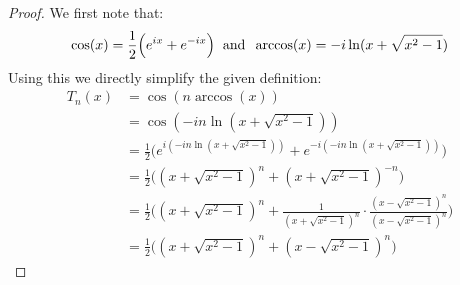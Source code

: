 \documentclass[12pt, letterpaper, onecolumn, conference, final]{IEEEtran}
\theoremstyle{definition}
\newtheorem{proposition}{Proposition}
\theoremstyle{plain}
\begin{document}
\begin{center}
\end{center}

\begin{proof}
We first note that:
\begin{equation*}
\cos(x) = \frac{1}{2}\Big( e^{ix} + e^{-ix} \Big) \hspace{.2cm} \text{and} \hspace{.2cm} \arccos(x) = -i\ln(x + \sqrt{x^2 - 1})
\end{equation*}
Using this we directly simplify the given definition:
\begin{equation*}
\begin{split}
T_n(x) &= \cos(n\arccos(x)) \\
&= \cos(-in\ln(x + \sqrt{x^2 - 1})) \\
&= \frac{1}{2} \Big( e^{i(-in\ln(x + \sqrt{x^2 - 1}))} + e^{-i(-in\ln(x + \sqrt{x^2 - 1}))} \Big) \\
&= \frac{1}{2} \Big( (x + \sqrt{x^2 - 1})^n + (x + \sqrt{x^2 - 1})^{-n} \Big) \\
&= \frac{1}{2} \Bigg( (x + \sqrt{x^2 - 1})^n + \frac{1}{(x + \sqrt{x^2 - 1})^n} \cdot \frac{(x - \sqrt{x^2 - 1})^n}{(x - \sqrt{x^2 - 1})^n} \Bigg) \\
&= \frac{1}{2} \Big( (x + \sqrt{x^2 - 1})^n + (x - \sqrt{x^2 - 1})^n \Big)
\end{split}
\end{equation*}
\end{proof}

\newpage
\begin{center}
\end{center}
\end{document}
